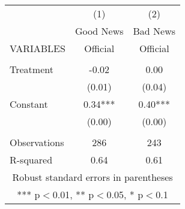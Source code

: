 \begin{tabular}{lcc} \hline
 & (1) & (2) \\
 & Good News & Bad News \\
VARIABLES & Official & Official \\ \hline
 &  &  \\
Treatment & -0.02 & 0.00 \\
 & (0.01) & (0.04) \\
Constant & 0.34*** & 0.40*** \\
 & (0.00) & (0.00) \\
 &  &  \\
Observations & 286 & 243 \\
 R-squared & 0.64 & 0.61 \\ \hline
\multicolumn{3}{c}{ Robust standard errors in parentheses} \\
\multicolumn{3}{c}{ *** p$<$0.01, ** p$<$0.05, * p$<$0.1} \\
\end{tabular}
